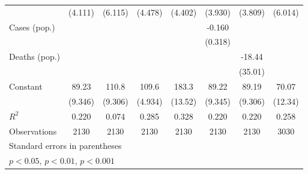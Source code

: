 \documentclass{article}
\begin{document}
{\begin{longtable}{l*{7}{c}}
                &  (4.111)         &  (6.115)         &  (4.478)         &  (4.402)         &  (3.930)         &  (3.809)         &  (6.014)         \\
Cases (pop.)    &                  &                  &                  &                  &   -0.160         &                  &                  \\
                &                  &                  &                  &                  &  (0.318)         &                  &                  \\
Deaths (pop.)   &                  &                  &                  &                  &                  &   -18.44         &                  \\
                &                  &                  &                  &                  &                  &  (35.01)         &                  \\
Constant        &    89.23\sym{***}&    110.8\sym{***}&    109.6\sym{***}&    183.3\sym{***}&    89.22\sym{***}&    89.19\sym{***}&    70.07\sym{***}\\
                &  (9.346)         &  (9.306)         &  (4.934)         &  (13.52)         &  (9.345)         &  (9.306)         &  (12.34)         \\
\hline
\(R^{2}\)       &    0.220         &    0.074         &    0.285         &    0.328         &    0.220         &    0.220         &    0.258         \\
Observations    &     2130         &     2130         &     2130         &     2130         &     2130         &     2130         &     3030         \\
\hline\hline
\multicolumn{8}{l}{\footnotesize Standard errors in parentheses}\\
\multicolumn{8}{l}{\footnotesize \sym{*} \(p<0.05\), \sym{**} \(p<0.01\), \sym{***} \(p<0.001\)}\\
\end{longtable}
}
\end{document}
